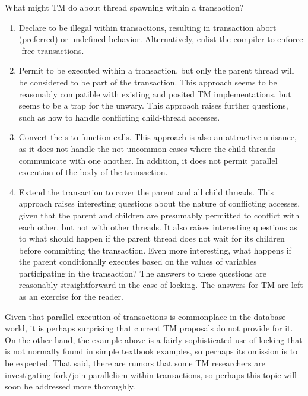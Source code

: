 What might TM do about thread spawning within a transaction?

\begin{enumerate}
\item	Declare  to be illegal within transactions,
	resulting in transaction abort (preferred) or undefined
	behavior. Alternatively, enlist the compiler to enforce
	-free transactions.
\item	Permit  to be executed within a
	transaction, but only the parent thread will be considered to
	be part of the transaction.
	This approach seems to be reasonably compatible with existing and
	posited TM implementations, but seems to be a trap for the unwary.
	This approach raises further questions, such as how to handle
	conflicting child-thread accesses.
\item	Convert the s to function calls.
	This approach is also an attractive nuisance, as it does not
	handle the not-uncommon cases where the child threads communicate
	with one another.
	In addition, it does not permit parallel execution of the body
	of the transaction.
\item	Extend the transaction to cover the parent and all child threads.
	This approach raises interesting questions about the nature of
	conflicting accesses, given that the parent and children are
	presumably permitted to conflict with each other, but not with
	other threads.
	It also raises interesting questions as to what should happen
	if the parent thread does not wait for its children before
	committing the transaction.
	Even more interesting, what happens if the parent conditionally
	executes  based on the values of variables
	participating in the transaction?
	The answers to these questions are reasonably straightforward
	in the case of locking.
	The answers for TM are left as an exercise for the reader.
\end{enumerate}

Given that parallel execution of transactions is commonplace in the
database world, it is perhaps surprising that current TM proposals do
not provide for it.
On the other hand, the example above is a fairly sophisticated use
of locking that is not normally found in simple textbook examples,
so perhaps its omission is to be expected.
That said, there are rumors that some TM researchers are investigating
fork/join parallelism within transactions, so perhaps this topic will
soon be addressed more thoroughly.

